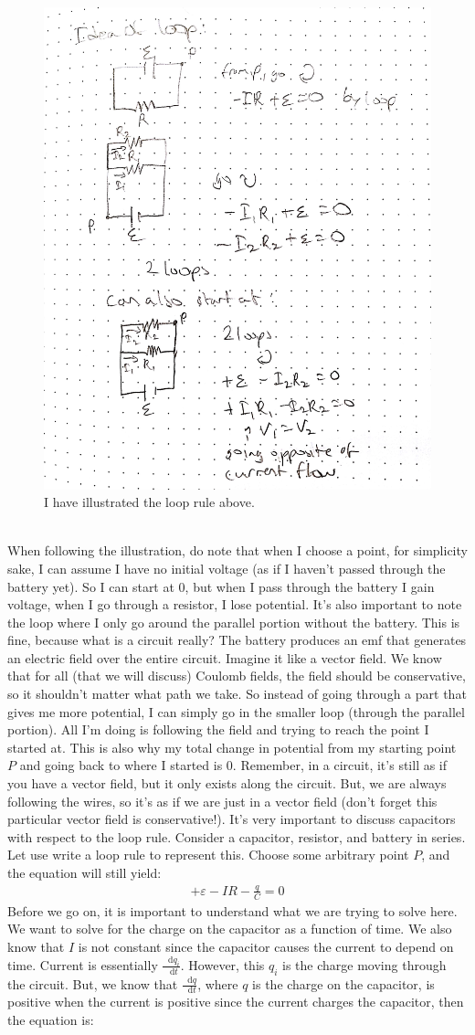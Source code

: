 \documentclass{article}
\newcommand*\dif{\mathop{}\!\mathrm{d}}
\begin{document}
\pagebreak
\begin{figure}[ht]
\center
\includegraphics[width=.3\textwidth]{images/Week2pic5.jpg}
\caption{I have illustrated the loop rule above.}
\end{figure}
\\
When following the illustration, do note that when I choose a point, for simplicity sake, I can assume I have no initial voltage (as if I haven't passed through the battery yet). So I can start at $0$, but when I pass through the battery I gain voltage, when I go through a resistor, I lose potential. It's also important to note the loop where I only go around the parallel portion without the battery. This is fine, because what is a circuit really? The battery produces an emf that generates an electric field over the entire circuit. Imagine it like a vector field. We know that for all (that we will discuss) Coulomb fields, the field should be conservative, so it shouldn't matter what path we take. So instead of going through a part that gives me more potential, I can simply go in the smaller loop (through the parallel portion). All I'm doing is following the field and trying to reach the point I started at. This is also why my total change in potential from my starting point $P$ and going back to where I started is $0$. Remember, in a circuit, it's still as if you have a vector field, but it only exists along the circuit. But, we are always following the wires, so it's as if we are just in a vector field (don't forget this particular vector field is conservative!).  
It's very important to discuss capacitors with respect to the loop rule. Consider a capacitor, resistor, and battery in series. Let use write a loop rule to represent this. Choose some arbitrary point $P$, and the equation will still yield: 
\begin{align*}
+\varepsilon - IR - \frac{q}{C} = 0
\end{align*}
Before we go on, it is important to understand what we are trying to solve here. We want to solve for the charge on the capacitor as a function of time. We also know that $I$ is not constant since the capacitor causes the current to depend on time. Current is essentially $\frac{\dif q_i}{\dif t}$. However, this $q_i$ is the charge moving through the circuit. But, we know that $\frac{\dif q}{\dif t}$, where $q$ is the charge on the capacitor, is positive when the current is positive since the current charges the capacitor, then the equation is:
\end{document}
